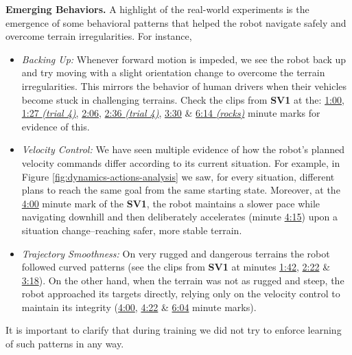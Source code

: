 \documentclass[Afour,sageh,times]{sagej}
\theoremstyle{lemma}
\begin{document}
\textbf{Emerging Behaviors.} A highlight of the real-world experiments is the emergence of some behavioral patterns that helped the robot navigate safely and overcome terrain irregularities. For instance,
\begin{itemize}
    \item \textit{Backing Up:} Whenever forward motion is impeded, we see the robot back up and try moving with a slight orientation change to overcome the terrain irregularities. This mirrors the behavior of human drivers when their vehicles become stuck in challenging terrains. Check the clips from \textbf{SV1} at the: \href{https://youtu.be/7a-NzAackE4?t=60}{1:00}, \href{https://youtu.be/7a-NzAackE4?t=87}{1:27 \textit{(trial 4)}}, \href{https://youtu.be/7a-NzAackE4?t=126}{2:06}, \href{https://youtu.be/7a-NzAackE4?t=156}{2:36 \textit{(trial 4)}}, \href{https://youtu.be/7a-NzAackE4?t=210}{3:30} \& \href{https://youtu.be/7a-NzAackE4?t=374}{6:14 \textit{(rocks)}} minute marks for evidence of this.   
    \item \textit{Velocity Control:} We have seen multiple evidence of how the robot's planned velocity commands differ according to its current situation. For example, in Figure \ref{fig:dynamics-actions-analysis} we saw, for every situation, different plans to reach the same goal from the same starting state. Moreover, at the \href{https://youtu.be/7a-NzAackE4?t=240}{4:00} minute mark of the \textbf{SV1}, the robot maintains a slower pace while navigating downhill and then deliberately accelerates (minute \href{https://youtu.be/7a-NzAackE4?t=255}{4:15}) upon a situation change--reaching safer, more stable terrain.
    \item \textit{Trajectory Smoothness:} On very rugged and dangerous terrains the robot followed curved patterns (see the clips from \textbf{SV1} at minutes \href{https://youtu.be/7a-NzAackE4?t=102}{1:42}, \href{https://youtu.be/7a-NzAackE4?t=142}{2:22} \& \href{https://youtu.be/7a-NzAackE4?t=198}{3:18}). On the other hand, when the terrain was not as rugged and steep, the robot approached its targets directly, relying only on the velocity control to maintain its integrity (\href{https://youtu.be/7a-NzAackE4?t=240}{4:00}, \href{https://youtu.be/7a-NzAackE4?t=263}{4:22} \& \href{https://youtu.be/7a-NzAackE4?t=364}{6:04} minute marks).
    
\end{itemize}
It is important to clarify that during training we did not try to enforce learning of such patterns in any way. 
\end{document}
